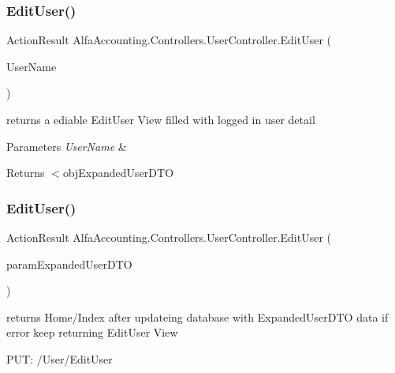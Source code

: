 \subsubsection{\texorpdfstring{Edit\+User()}{EditUser()}\hspace{0.1cm}{\footnotesize\ttfamily [1/2]}}
{\footnotesize\ttfamily Action\+Result Alfa\+Accounting.\+Controllers.\+User\+Controller.\+Edit\+User (\begin{DoxyParamCaption}\item[{string}]{User\+Name }\end{DoxyParamCaption})}



returns a ediable Edit\+User View filled with logged in user detail 


\begin{DoxyParams}{Parameters}
{\em User\+Name} & \\
\hline
\end{DoxyParams}
\begin{DoxyReturn}{Returns}
$<$obj\+Expanded\+User\+D\+TO 
\end{DoxyReturn}
\mbox{\label{class_alfa_accounting_1_1_controllers_1_1_user_controller_aba377f7d0cebab4e38359d6082fe3845}} 
\subsubsection{\texorpdfstring{Edit\+User()}{EditUser()}\hspace{0.1cm}{\footnotesize\ttfamily [2/2]}}
{\footnotesize\ttfamily Action\+Result Alfa\+Accounting.\+Controllers.\+User\+Controller.\+Edit\+User (\begin{DoxyParamCaption}\item[{Expanded\+User\+D\+TO}]{param\+Expanded\+User\+D\+TO }\end{DoxyParamCaption})}



returns Home/\+Index after updateing database with Expanded\+User\+D\+TO data if error keep returning Edit\+User View 

P\+UT\+: /\+User/\+Edit\+User



